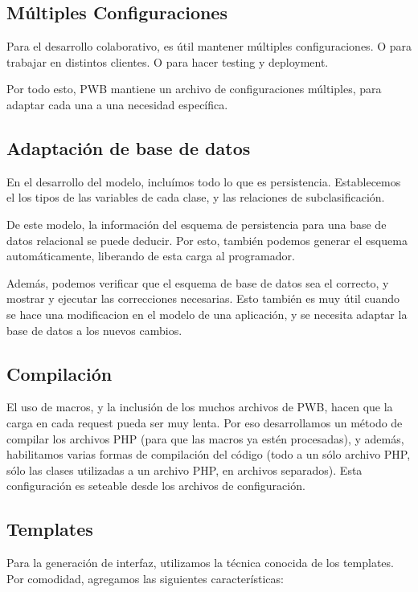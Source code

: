 \subsection{Múltiples Configuraciones}

Para el desarrollo colaborativo, es útil mantener múltiples configuraciones. O para trabajar en distintos
clientes. O para hacer testing y deployment.

Por todo esto, PWB mantiene un archivo de configuraciones múltiples, para adaptar cada una a una necesidad
específica.

\subsection{Adaptación de base de datos}

En el desarrollo del modelo, incluímos todo lo que es persistencia. Establecemos el los tipos de las variables
de cada clase, y las relaciones de subclasificación.

De este modelo, la información del esquema de persistencia para una base de datos relacional se puede deducir.
Por esto, también podemos generar el esquema automáticamente, liberando de esta carga al programador.

Además, podemos verificar que el esquema de base de datos sea el correcto, y mostrar y ejecutar las correcciones
necesarias. Esto también es muy útil cuando se hace una modificacion en el modelo de una aplicación, y se necesita
adaptar la base de datos a los nuevos cambios.

\subsection{Compilación}

El uso de macros, y la inclusión de los muchos archivos de PWB, hacen que la carga en cada request pueda ser
muy lenta. Por eso desarrollamos un método de compilar los archivos PHP (para que las macros ya estén procesadas),
y además, habilitamos varias formas de compilación del código (todo a un sólo archivo PHP, sólo las clases
utilizadas a un archivo PHP, en archivos separados). Esta configuración es seteable desde los archivos de
configuración.

\subsection{Templates}

Para la generación de interfaz, utilizamos la técnica conocida de los templates.
Por comodidad, agregamos las siguientes características:

